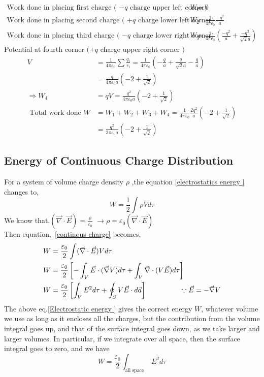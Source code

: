 \begin{answer}
	\begin{align*}
	\text{Work done in placing first charge ( $-q$ charge upper left corner) }W_{1}&=0\\
	\text{Work done in placing second charge ( $+q$ charge lower left corner)} W_{2}&=\frac{1}{4\pi \epsilon_{0}}\frac{-q^{2}}{a}\\
	\text{Work done in placing third charge ( $-q$ charge lower right corner)} W_{3}&=\frac{1}{4\pi \epsilon_{0}}\left( \frac{-q^{2}}{a}+\frac{-q^{2}}{\sqrt{2}a} \right) 
	\end{align*}
	Potential at fourth corner $(+q$ charge upper right corner $)$
	\begin{align*}
	V&=\frac{1}{4 \pi \varepsilon_{0}} \sum \frac{q_{i}}{r_{i}}=\frac{1}{4 \pi \varepsilon_{0}}\left(-\frac{q}{a}+\frac{q}{\sqrt{2} a}-\frac{q}{a}\right)\\&=\frac{q}{4 \pi \varepsilon_{0} a}\left(-2+\frac{1}{\sqrt{2}}\right) \\
	\Rightarrow W_{4}&=q V=\frac{q^{2}}{4 \pi \varepsilon_{0} a}\left(-2+\frac{1}{\sqrt{2}}\right) \\
	\text { Total work done }W&=W_{1}+W_{2}+W_{3}+W_{4}=\frac{1}{4 \pi \varepsilon_{0}} \frac{2 q^{2}}{a}\left(-2+\frac{1}{\sqrt{2}}\right)\\&=\frac{q^{2}}{2 \pi \varepsilon_{0} a}\left(-2+\frac{1}{\sqrt{2}}\right)
	\end{align*}
\end{answer}
\subsection{Energy of Continuous Charge Distribution}
For a system of volume charge density $\rho$ ,the equation \ref{electrostatics energy
} changes to,
\begin{equation}
W=\frac{1}{2} \int \rho V d \tau\label{continous charge}
\end{equation}
We know that,$(\vec{\nabla} \cdot \vec{E})=\frac{\rho}{\varepsilon_{0}}$
$\rightarrow$$\rho=\varepsilon_{0}(\vec{\nabla} \cdot \vec{E}) $ \\Then equation,\ \ref{continous charge} becomes,
\begin{align}
W&=\frac{\varepsilon_{0}}{2} \int(\vec{\nabla} \cdot \vec{E}) V d \tau\notag \\ W&=\frac{\varepsilon_{0}}{2}\left[-\int_{V} \vec{E} \cdot(\vec{\nabla} V) d \tau+\int_{V} \vec{\nabla} \cdot(V \vec{E}) d \tau\right]\notag\\
W&=\frac{\varepsilon_{0}}{2}\left[\int_{V} E^{2} d \tau+\oint_{S} V \vec{E} \cdot d \vec{a}\right] \hspace{1cm}\qquad\because\vec{E}=-\vec{\nabla} V \label{Electrostatic energy }
\end{align}
The above eq.\ref{Electrostatic energy } gives the correct energy $W$, whatever volume we use as long as it
encloses all the charges, but the contribution from the volume integral goes up, and that of
the surface integral goes down, as we take larger and larger volumes. In particular, if we
integrate over all space, then the surface integral goes to zero, and we have
$$
W=\frac{\varepsilon_{0}}{2} \int_{\text {all space }} E^{2} d \tau
$$
